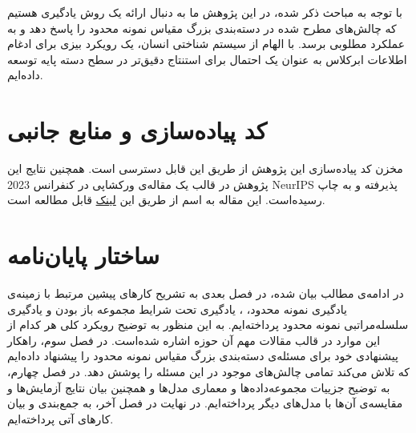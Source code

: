 با توجه به مباحث ذکر شده، در این پژوهش ما به دنبال ارائه یک روش یادگیری هستیم که چالش‌های مطرح شده در دسته‌بندی بزرگ مقیاس نمونه محدود را پاسخ دهد و به عملکرد مطلوبی برسد. با الهام از سیستم شناختی انسان، یک رویکرد بیزی برای ادغام اطلاعات ابرکلاس به عنوان یک احتمال 
 برای استنتاج دقیق‌تر در سطح دسته پایه توسعه داده‌ایم.

\section{کد پیاده‌سازی و منابع جانبی}

مخزن کد پیاده‌سازی این پژوهش از طریق این 
\href{https://github.com/mohamadreza99/divide\_and\_conquer}{
}
قابل دسترسی است. همچنین نتایج این پژوهش در قالب یک مقاله‌ی ورکشاپی در کنفرانس 2023 NeurIPS پذیرفته و به چاپ رسیده‌است. این مقاله به اسم
از طریق این
\href{https://openreview.net/forum?id=ED7E1fUAk2}{لینک}
 قابل مطالعه است.
\section{ساختار پایان‌نامه}
در ادامه‌ی مطالب بیان شده، در فصل بعدی به تشریح کار‌های پیشین مرتبط با زمینه‌ی یادگیری نمونه محدود، 
، یادگیری تحت شرایط مجموعه باز بودن و یادگیری سلسله‌مراتبی نمونه محدود پرداخته‌ایم. به این منظور به توضیح رویکرد کلی هر کدام از این موارد در قالب مقالات مهم آن حوزه اشاره شده‌است. 
 در فصل سوم، راهکار پیشنهادی خود برای مسئله‌ی دسته‌بندی بزرگ مقیاس نمونه محدود را پیشنهاد داده‌ایم که تلاش می‌کند تمامی چالش‌های موجود در این مسئله را پوشش دهد.
 در فصل چهارم، به توضیح جزییات مجموعه‌داده‌ها و معماری مدل‌ها و همچنین بیان نتایج آزمایش‌ها و مقایسه‌ی آن‌ها با مدل‌های دیگر پرداخته‌ایم. در نهایت در فصل آخر، به جمع‌بندی و بیان کار‌های آتی پرداخته‌ایم.


